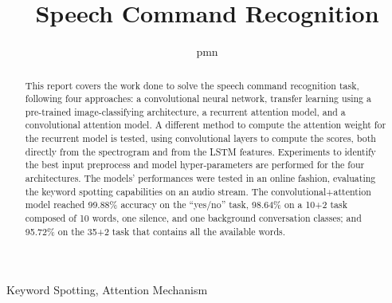 \documentclass[10pt, conference, letterpaper]{IEEEtran}
\title{Speech Command Recognition}
\author{pmn}
\begin{document}
\maketitle

\begin{abstract} This report covers the work done to solve the speech command
    recognition task, following four approaches: a convolutional neural
    network, transfer learning using a pre-trained image-classifying
    architecture, a recurrent attention model, and a convolutional attention
    model.
    A different method to compute the attention weight for the recurrent model
    is tested, using convolutional layers to compute the scores, both directly
    from the spectrogram and from the LSTM features.
    Experiments to identify the best input preprocess and model
    hyper-parameters are performed for the four architectures.
    The models' performances were tested in an online fashion, evaluating the
    keyword spotting capabilities on an audio stream.
    The convolutional+attention model reached 99.88\% accuracy on the ``yes/no''
    task, 98.64\% on a 10+2 task composed of 10 words, one silence, and one
    background conversation classes; and 95.72\% on the 35+2 task that contains
    all the available words.
\end{abstract}

\IEEEkeywords
Keyword Spotting,
Attention Mechanism
\endIEEEkeywords















\end{document}
